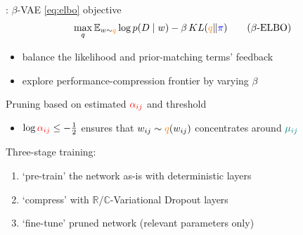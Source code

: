 \documentclass{beamer}
\newcommand{\real}{\mathbb{R}}
\newcommand{\cplx}{\mathbb{C}}
\begin{document}
\begin{frame}[c]{\insertsection: \insertsubsection}
  $\beta$-VAE \ref{eq:elbo} objective {\tiny \citep{higgins_beta-vae_2017}}
  \begin{equation}
  \label{eq:beta_elbo}
    \max_q
    \mathbb{E}_{w \sim {\color{orange} q}}
      \log p(D \mid w)  %
      - \beta \mathop{KL}({\color{orange} q}\|{\color{blue} \pi})
    \tag{$\beta$-ELBO}
  \end{equation}
  \vspace{-1em}
  \begin{itemize}
    \item balance the likelihood and prior-matching terms' feedback
    \item explore performance-compression frontier by varying $\beta$
  \end{itemize}

  \pause
  \medskip
  Pruning based on estimated ${\color{red} \alpha_{ij}}$ and threshold
  \begin{itemize}
    \item $
      \log{{\color{red} \alpha_{ij}}} \leq -\tfrac12
    $ ensures that $
      w_{ij} \sim {\color{orange} q}(w_{ij})
    $ concentrates around ${\color{teal} \mu_{ij}}$
  \end{itemize}

  \pause
  \medskip
  Three-stage training:
  \begin{enumerate}
    \item `pre-train' the network as-is with deterministic layers
    \item `compress' with $\real$/$\cplx$-Variational Dropout layers
    \item `fine-tune' pruned network (relevant parameters only)
  \end{enumerate}

\end{frame}
\end{document}
